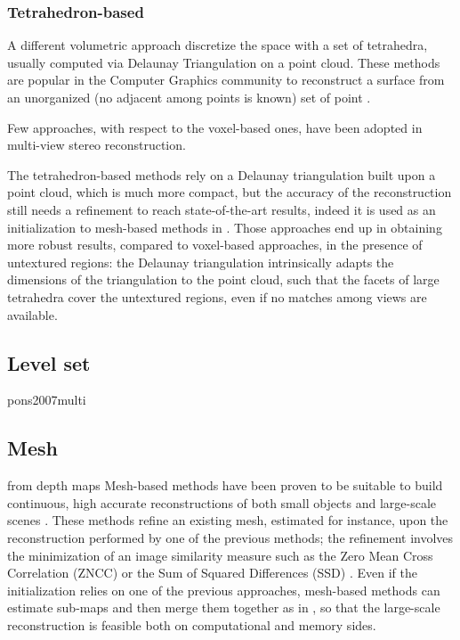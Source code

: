 \subsubsection{Tetrahedron-based}
A different volumetric approach discretize the space with a set of tetrahedra, usually computed via Delaunay Triangulation on a point cloud.
These methods are popular in the Computer Graphics community to reconstruct a surface from an unorganized (no adjacent among points is known) set of point \cite{amenta1999surface,amenta2001power,boissonnat1984geometric,dey2004provable,kolluri2004spectral}. 

Few approaches, with respect to the voxel-based ones, have been adopted in multi-view stereo reconstruction.


\cite{faugeras_et_al_90,pons2007delaunay,labatut2007efficient,salman2010surface,vu_et_al_2012,hiep2009towards}



The tetrahedron-based methods rely on a Delaunay triangulation built upon a point cloud, which is much more compact, but the accuracy of the reconstruction still needs a refinement to reach state-of-the-art results, indeed it is used as an initialization to mesh-based methods in \cite{vu_et_al_2012,hiep2009towards,salman2010surface}.
Those approaches end up in obtaining more robust results, compared to voxel-based approaches, in the presence of untextured regions: the Delaunay triangulation intrinsically adapts the dimensions of the triangulation to the point cloud, such that the facets of large tetrahedra cover the untextured regions, even if no matches among views are available.

\subsection{Level set}

pons2007multi
\subsection{Mesh}
from depth maps
\cite{turk1994zippered,pollefeys_et_al_08,akbarzadeh_et_al06,bradley2008accurate}
Mesh-based methods have been proven to be suitable to build continuous, high accurate reconstructions of both small objects and large-scale scenes \cite{hiep2009towards,vu_et_al_2012,salman2010surface,vu2011large}.
These methods refine an existing mesh, estimated for instance,  upon the reconstruction performed by one of the previous methods; the refinement involves the minimization of an image similarity measure such as the Zero Mean Cross Correlation (ZNCC) \cite{hiep2009towards,pons2007multi,zaharescu2007transformesh} or the Sum of Squared Differences (SSD) \cite{delaunoy_et_al_08,gargallo2007minimizing,delaunoy2011gradient}. 
Even if the initialization relies on one of the previous approaches, mesh-based methods can estimate sub-maps and then merge them together as in \cite{vu2011large}, so that the large-scale reconstruction is feasible both on computational and memory sides.


